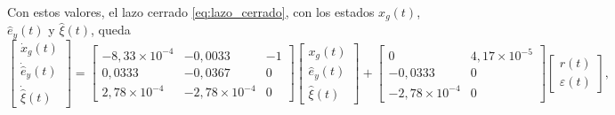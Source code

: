 Con estos valores, el lazo cerrado \eqref{eq:lazo_cerrado}, con los estados
$x_g(t)$, $\hat{e}_y(t)$ y $\hat{\xi}(t)$, queda
\begin{equation}
\begin{bmatrix} \dot{x}_g(t) \\ \dot{\hat{e}}_y(t) \\ \dot{\hat{\xi}}(t) \end{bmatrix}
=
\begin{bmatrix}
-8{,}33\times10^{-4} & -0{,}0033 & -1 \\
0{,}0333 & -0{,}0367 & 0 \\
2{,}78\times10^{-4} & -2{,}78\times10^{-4} & 0
\end{bmatrix}
\begin{bmatrix} x_g(t) \\ \hat{e}_y(t) \\ \hat{\xi}(t) \end{bmatrix}
+
\begin{bmatrix}
0 & 4{,}17\times10^{-5} \\
-0{,}0333 & 0 \\
-2{,}78\times10^{-4} & 0
\end{bmatrix}
\begin{bmatrix} r(t) \\ \varepsilon(t) \end{bmatrix},
\label{eq:caso_lazo_cerrado}
\end{equation}

